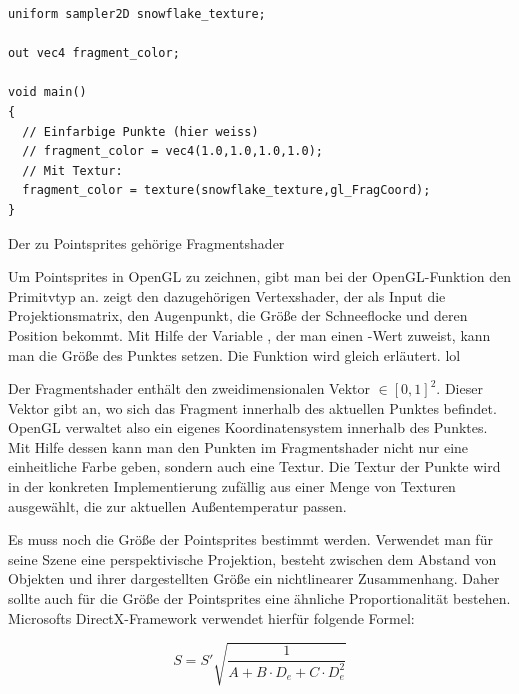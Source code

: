 \begin{listing}
\begin{verbatim}
uniform sampler2D snowflake_texture;

out vec4 fragment_color;

void main()
{
  // Einfarbige Punkte (hier weiss)
  // fragment_color = vec4(1.0,1.0,1.0,1.0);
  // Mit Textur:
  fragment_color = texture(snowflake_texture,gl_FragCoord);
}
\end{verbatim}
\caption{Der zu Pointsprites gehörige Fragmentshader}
\label{lst:implementation_point_sprite_fragment_shader}
\end{listing}

Um Pointsprites in OpenGL zu zeichnen, gibt man bei der OpenGL-Funktion
 den Primitvtyp
an. 
zeigt den dazugehörigen Vertexshader, der als Input die
Projektionsmatrix, den Augenpunkt, die Größe der Schneeflocke und
deren Position bekommt. Mit Hilfe der Variable
, der man einen
-Wert zuweist, kann man die Größe des Punktes
setzen. Die Funktion  wird gleich erläutert.
lol

Der Fragmentshader
enthält den zweidimensionalen Vektor
 $\in [0,1]^2$. Dieser Vektor gibt
an, wo sich das Fragment innerhalb des aktuellen Punktes
befindet. OpenGL verwaltet also ein eigenes Koordinatensystem
innerhalb des Punktes. Mit Hilfe dessen kann man den Punkten im
Fragmentshader nicht nur eine einheitliche Farbe geben, sondern auch
eine Textur. Die Textur der Punkte wird in der konkreten
Implementierung zufällig aus einer Menge von Texturen ausgewählt, die
zur aktuellen Außentemperatur passen.

Es muss noch die Größe der Pointsprites bestimmt werden. Verwendet
man für seine Szene eine perspektivische Projektion, besteht zwischen
dem Abstand von Objekten und ihrer dargestellten Größe ein
nichtlinearer Zusammenhang. Daher sollte auch für die Größe der
Pointsprites eine ähnliche Proportionalität bestehen. Microsofts
DirectX-Framework verwendet hierfür folgende
Formel\cite{DirectXPointSprites}:

\begin{equation}
S =
S'
\sqrt{
  \frac
  {
    1
  }
  {
    A +
    B \cdot D_e +
    C \cdot D_e^2
  }
}
\end{equation}

